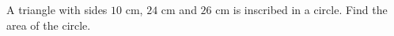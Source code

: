 A triangle with sides $10$ cm, $24$ cm and $26$ cm is inscribed in a circle. Find the area of the circle.
